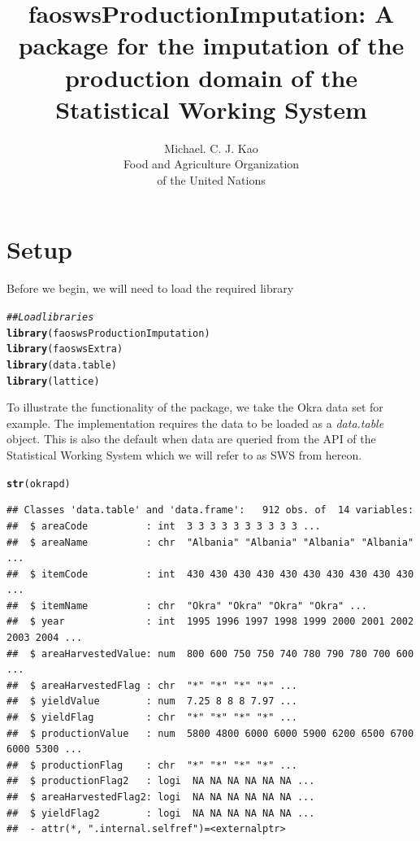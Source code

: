 \documentclass[nojss]{jss}\usepackage[]{graphicx}\usepackage[]{color}
\title{\bf faoswsProductionImputation: A package for the imputation of
  the production domain of the Statistical Working System}
\author{Michael. C. J. Kao\\ Food and Agriculture Organization \\ of
  the United Nations}
\makeatletter
\newcommand{\hlcom}[1]{\textcolor[rgb]{0.678,0.584,0.686}{\textit{#1}}}%
\newcommand{\hlstd}[1]{\textcolor[rgb]{0.345,0.345,0.345}{#1}}%
\newcommand{\hlkwd}[1]{\textcolor[rgb]{0.737,0.353,0.396}{\textbf{#1}}}%
\newenvironment{kframe}{%
 \def\at@end@of@kframe{}%
 \ifinner\ifhmode%
  \def\at@end@of@kframe{\end{minipage}}%
  \begin{minipage}{\columnwidth}%
 \fi\fi%
 \def\FrameCommand##1{\hskip\@totalleftmargin \hskip-\fboxsep
 \colorbox{shadecolor}{##1}\hskip-\fboxsep
     \hskip-\linewidth \hskip-\@totalleftmargin \hskip\columnwidth}%
 \MakeFramed {\advance\hsize-\width
   \@totalleftmargin\z@ \linewidth\hsize
   \@setminipage}}%
 {\par\unskip\endMakeFramed%
 \at@end@of@kframe}
\newenvironment{knitrout}{}{} %
\makeatother
\begin{document}
\section{Setup}


Before we begin, we will need to load the required library

\begin{knitrout}
\color{fgcolor}\begin{kframe}
\begin{alltt}
\hlcom{## Load libraries}
\hlkwd{library}\hlstd{(faoswsProductionImputation)}
\hlkwd{library}\hlstd{(faoswsExtra)}
\hlkwd{library}\hlstd{(data.table)}
\hlkwd{library}\hlstd{(lattice)}
\end{alltt}
\end{kframe}
\end{knitrout}



To illustrate the functionality of the package, we take the Okra data
set for example. The implementation requires the data to be loaded as
a \textit{data.table} object. This is also the default when data are
queried from the API of the Statistical Working System which we will
refer to as SWS from hereon.

\begin{knitrout}
\color{fgcolor}\begin{kframe}
\begin{alltt}
\hlkwd{str}\hlstd{(okrapd)}
\end{alltt}
\begin{verbatim}
## Classes 'data.table' and 'data.frame':	912 obs. of  14 variables:
##  $ areaCode          : int  3 3 3 3 3 3 3 3 3 3 ...
##  $ areaName          : chr  "Albania" "Albania" "Albania" "Albania" ...
##  $ itemCode          : int  430 430 430 430 430 430 430 430 430 430 ...
##  $ itemName          : chr  "Okra" "Okra" "Okra" "Okra" ...
##  $ year              : int  1995 1996 1997 1998 1999 2000 2001 2002 2003 2004 ...
##  $ areaHarvestedValue: num  800 600 750 750 740 780 790 780 700 600 ...
##  $ areaHarvestedFlag : chr  "*" "*" "*" "*" ...
##  $ yieldValue        : num  7.25 8 8 8 7.97 ...
##  $ yieldFlag         : chr  "*" "*" "*" "*" ...
##  $ productionValue   : num  5800 4800 6000 6000 5900 6200 6500 6700 6000 5300 ...
##  $ productionFlag    : chr  "*" "*" "*" "*" ...
##  $ productionFlag2   : logi  NA NA NA NA NA NA ...
##  $ areaHarvestedFlag2: logi  NA NA NA NA NA NA ...
##  $ yieldFlag2        : logi  NA NA NA NA NA NA ...
##  - attr(*, ".internal.selfref")=<externalptr>
\end{verbatim}
\end{kframe}
\end{knitrout}
\end{document}

